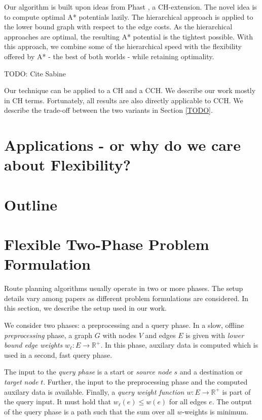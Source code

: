 \documentclass[a4paper,UKenglish,cleveref, autoref]{lipics-v2019}
\begin{document}
Our algorithm is built upon ideas from Phast \cite{?}, a CH-extension.
The novel idea is to compute optimal A* potentials lazily.
The hierarchical approach is applied to the lower bound graph with respect to the edge costs.
As the hierarchical approaches are optimal, the resulting A* potential is the tightest possible.
With this approach, we combine some of the hierarchical speed with the flexibility offered by A* - the best of both worlds - while retaining optimality.

TODO: Cite Sabine

Our technique can be applied to a CH and a CCH.
We describe our work mostly in CH terms.
Fortunately, all results are also directly applicable to CCH.
We describe the trade-off between the two variants in Section \ref{TODO}.


\section{Applications - or why do we care about Flexibility?}




\section{Outline}

\section{Flexible Two-Phase Problem Formulation}

Route planning algorithms usually operate in two or more phases.
The setup details vary among papers as different problem formulations are considered.
In this section, we describe the setup used in our work.

We consider two phases: a preprocessing and a query phase.
In a slow, offline \emph{preprocessing} phase, a graph $G$ with nodes $V$ and edges $E$ is given with \emph{lower bound edge weights} $w_\ell : E\rightarrow \mathbb{R}^+$.
In this phase, auxilary data is computed which is used in a second, fast query phase.

The input to the \emph{query phase} is a start or \emph{source node} $s$ and a destination or \emph{target node} $t$.
Further, the input to the preprocessing phase and the computed auxilary data is available.
Finally, a \emph{query weight function} $w:E\rightarrow \mathbb{R}^+$ is part of the query input.
It must hold that $w_\ell(e) \le w(e)$ for all edges $e$.
The output of the query phase is a path such that the sum over all $w$-weights is minimum.
\end{document}
